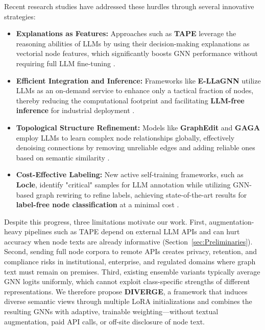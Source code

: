\documentclass[a4paper,fleqn]{cas-sc}
\begin{document}
Recent research studies have addressed these hurdles through several innovative strategies:
\begin{itemize}
    \item \textbf{Explanations as Features:} Approaches such as \textbf{TAPE} leverage the reasoning abilities of LLMs by using their decision-making explanations as vectorial node features, which significantly boosts GNN performance without requiring full LLM fine-tuning  \citep{he2024harnessing}.
    \item \textbf{Efficient Integration and Inference:} Frameworks like \textbf{E-LLaGNN} utilize LLMs as an on-demand service to enhance only a tactical fraction of nodes, thereby reducing the computational footprint and facilitating \textbf{LLM-free inference} for industrial deployment  \citep{Jaiswal2024AllAgainstSome}.
    \item \textbf{Topological Structure Refinement:} Models like \textbf{GraphEdit} and \textbf{GAGA} employ LLMs to learn complex node relationships globally, effectively denoising connections by removing unreliable edges and adding reliable ones based on semantic similarity  \citep{guo2024graphedit, li2024gaga, Sun2026TopologicalEnhancerTAG}.
    \item \textbf{Cost-Effective Labeling:} New active self-training frameworks, such as \textbf{Locle}, identify "critical" samples for LLM annotation while utilizing GNN-based graph rewiring to refine labels, achieving state-of-the-art results for \textbf{label-free node classification} at a minimal cost  \citep{zhang2025leveraging}.
\end{itemize}

Despite this progress, three limitations motivate our work. First, augmentation-heavy pipelines such as TAPE \citep{he2024harnessing} depend on external LLM APIs and can hurt accuracy when node texts are already informative (Section~\ref{sec:Preliminaries}). Second, sending full node corpora to remote APIs creates privacy, retention, and compliance risks in institutional, enterprise, and regulated domains where graph text must remain on premises. Third, existing ensemble variants typically average GNN logits uniformly, which cannot exploit class-specific strengths of different representations. We therefore propose \textbf{DIVERGE}, a framework that induces diverse semantic views through multiple LoRA initializations and combines the resulting GNNs with adaptive, trainable weighting---without textual augmentation, paid API calls, or off-site disclosure of node text.
\end{document}
